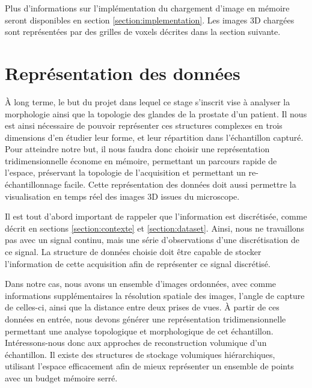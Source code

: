 {{        Plus d'informations sur l'implémentation du chargement d'image en mémoire seront disponibles en section \ref{section:implementation}. Les images 3D chargées sont représentées par des grilles de voxels décrites dans la section suivante.
	}

	\section{Représentation des données}\label{section:voxelgrid}
	{
		À long terme, le but du projet dans lequel ce stage s'inscrit vise à analyser la morphologie ainsi que la topologie des glandes de la prostate d'un patient. Il nous est ainsi nécessaire de pouvoir représenter ces structures complexes en trois dimensions d'en étudier leur forme, et leur répartition dans l'échantillon capturé. Pour atteindre notre but, il nous faudra donc choisir une représentation tridimensionnelle économe en mémoire, permettant un parcours rapide de l'espace, préservant la topologie de l'acquisition et permettant un re-échantillonnage facile. Cette représentation des données doit aussi permettre la visualisation en temps réel des images 3D issues du microscope.


		Il est tout d'abord important de rappeler que l'information est discrétisée, comme décrit en sections \ref{section:contexte} et \ref{section:dataset}. Ainsi, nous ne travaillons pas avec un signal continu, mais une série d'observations d'une discrétisation de ce signal. La structure de données choisie doit être capable de stocker l'information de cette acquisition afin de représenter ce signal discrétisé.

		Dans notre cas, nous avons un ensemble d'images ordonnées, avec comme informations supplémentaires la résolution spatiale des images, l'angle de capture de celles-ci, ainsi que la distance entre deux prises de vues. À partir de ces données en entrée, nous devons générer une représentation tridimensionnelle permettant une analyse topologique et morphologique de cet échantillon. Intéressons-nous donc aux approches de reconstruction volumique d'un échantillon. Il existe des structures de stockage volumiques hiérarchiques, utilisant l'espace efficacement afin de mieux représenter un ensemble de points avec un budget mémoire serré.

}}
